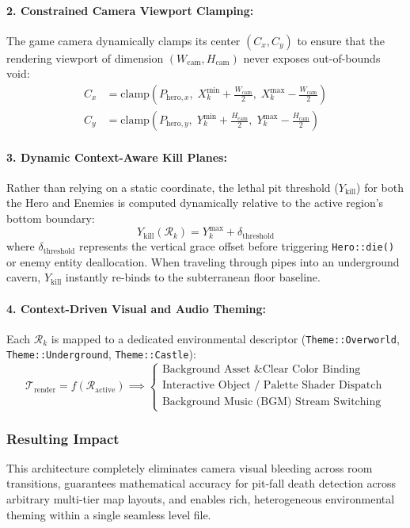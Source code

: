 \paragraph{2. Constrained Camera Viewport Clamping:} The game camera dynamically clamps its center $(C_x, C_y)$ to ensure that the rendering viewport of dimension $(W_{\text{cam}}, H_{\text{cam}})$ never exposes out-of-bounds void:
\begin{align}
    C_x &= \text{clamp}\left( P_{\text{hero}, x}, \; X_k^{\min} + \frac{W_{\text{cam}}}{2}, \; X_k^{\max} - \frac{W_{\text{cam}}}{2} \right) \\
    C_y &= \text{clamp}\left( P_{\text{hero}, y}, \; Y_k^{\min} + \frac{H_{\text{cam}}}{2}, \; Y_k^{\max} - \frac{H_{\text{cam}}}{2} \right)
\end{align}
\paragraph{3. Dynamic Context-Aware Kill Planes:} Rather than relying on a static coordinate, the lethal pit threshold ($Y_{\text{kill}}$) for both the Hero and Enemies is computed dynamically relative to the active region's bottom boundary:
\begin{equation}
    Y_{\text{kill}}(\mathcal{R}_k) = Y_k^{\max} + \delta_{\text{threshold}}
\end{equation}
where $\delta_{\text{threshold}}$ represents the vertical grace offset before triggering \texttt{Hero::die()} or enemy entity deallocation. When traveling through pipes into an underground cavern, $Y_{\text{kill}}$ instantly re-binds to the subterranean floor baseline.
\paragraph{4. Context-Driven Visual and Audio Theming:} Each $\mathcal{R}_k$ is mapped to a dedicated environmental descriptor (\texttt{Theme::Overworld}, \texttt{Theme::Underground}, \texttt{Theme::Castle}):
\begin{equation}
    \mathcal{T}_{\text{render}} = f(\mathcal{R}_{\text{active}}) \implies 
    \begin{cases}
        \text{Background Asset \& Clear Color Binding} \\
        \text{Interactive Object / Palette Shader Dispatch} \\
        \text{Background Music (BGM) Stream Switching}
    \end{cases}
\end{equation}
\subsubsection{Resulting Impact}
This architecture completely eliminates camera visual bleeding across room transitions, guarantees mathematical accuracy for pit-fall death detection across arbitrary multi-tier map layouts, and enables rich, heterogeneous environmental theming within a single seamless level file.   